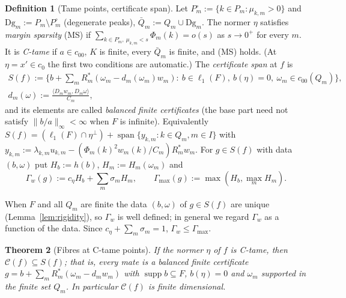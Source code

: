\documentclass[10pt]{amsart}
\newtheorem{theorem}{Theorem}[section]
\theoremstyle{definition}
\newtheorem{definition}[theorem]{Definition}
\theoremstyle{remark}
\newcommand{\supp}{\operatorname{supp}}
\newcommand{\spn}{\operatorname{span}}
\newcommand{\Cset}{\mathcal C}
\newcommand{\ip}[2]{\langle #1,#2\rangle}
\begin{document}
\begin{definition}[Tame points, certificate span]\label{def:tame}
Let $P^\circ_m:=\{k\in P_m:\mu_{k,m}>0\}$ and $\mathrm{Dg}_m:=P_m\setminus P_m^\circ$
(degenerate peaks), $\bar Q_m:=Q_m\cup \mathrm{Dg}_m$.  The normer $\eta$ satisfies
\emph{margin sparsity} \textup{(MS)} if
$\sum_{k\in P_m^\circ,\ \mu_{k,m}<s}\Phi_m(k)=o(s)$ as $s\to0^+$ for every
$m$.  It is \emph{C-tame} if $a\in c_{00}$, $K$ is finite, every
$\bar Q_m$ is finite, and \textup{(MS)} holds.  (At $\eta=x'\in c_0$ the
first two conditions are automatic.)  The \emph{certificate span} at $f$ is
\begin{gather*}
 S(f):=\Big\{b+\sum_mR_m^*(\omega_m-d_m(\omega_m)w_m):\ b\in\ell_1(F),\
 b(\eta)=0,\ \omega_m\in c_{00}(Q_m)\Big\},\\
 d_m(\omega):=\frac{\ip{D_mw_m}{D_m\omega}}{C_m},
\end{gather*}
and its elements are called \emph{balanced finite certificates} (the base
part need not satisfy $\|b/a\|_\infty<\infty$ when $F$ is infinite).
Equivalently
$S(f)=(\ell_1(F)\cap\eta^\perp)+\spn\{y_{k,m}:k\in Q_m,m\in I\}$ with
$y_{k,m}:=\lambda_{k,m}u_{k,m}-(\Phi_m(k)^2w_m(k)/C_m)R_m^*w_m$.  For
$g\in S(f)$ with data $(b,\omega)$ put $H_b:=h(b)$, $H_m:=H_m(\omega_m)$ and
\[
 \Gamma_w(g):=c_\eta H_b+\sum_m\sigma_mH_m,\qquad
 \Gamma_{\max}(g):=\max(H_b,\max_mH_m).
\]
\end{definition}

When $F$ and all $Q_m$ are finite the data $(b,\omega)$ of $g\in S(f)$ are
unique (Lemma~\ref{lem:rigidity}), so $\Gamma_w$ is well defined; in general
we regard $\Gamma_w$ as a function of the data.  Since $c_\eta+\sum_m
\sigma_m=1$, $\Gamma_w\le\Gamma_{\max}$.

\begin{theorem}[Fibres at C-tame points]\label{thm:tamefibre}
If the normer $\eta$ of $f$ is C-tame, then $\Cset(f)\subseteq S(f)$; that
is, every mate is a balanced finite certificate
$g=b+\sum_mR_m^*(\omega_m-d_mw_m)$ with $\supp b\subseteq F$, $b(\eta)=0$
and $\omega_m$ supported in the finite set $Q_m$.  In particular
$\Cset(f)$ is finite dimensional.
\end{theorem}
\end{document}
